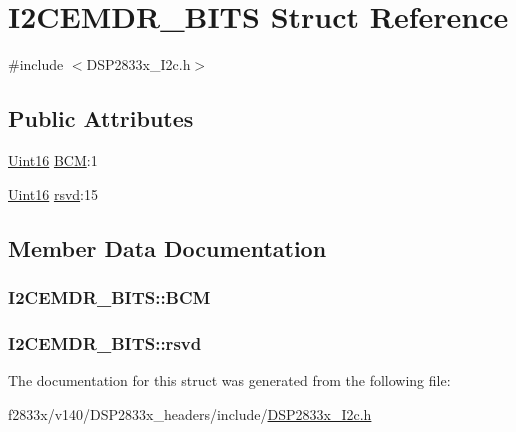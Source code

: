 \hypertarget{struct_i2_c_e_m_d_r___b_i_t_s}{}\section{I2\+C\+E\+M\+D\+R\+\_\+\+B\+I\+T\+S Struct Reference}
\label{struct_i2_c_e_m_d_r___b_i_t_s}


{\ttfamily \#include $<$D\+S\+P2833x\+\_\+\+I2c.\+h$>$}

\subsection*{Public Attributes}
\begin{DoxyCompactItemize}
\item 
\hyperlink{_d_s_p2833x___device_8h_a59a9f6be4562c327cbfb4f7e8e18f08b}{Uint16} \hyperlink{struct_i2_c_e_m_d_r___b_i_t_s_aebd250c5011e2a707e99aa3416451302}{B\+C\+M}\+:1
\item 
\hyperlink{_d_s_p2833x___device_8h_a59a9f6be4562c327cbfb4f7e8e18f08b}{Uint16} \hyperlink{struct_i2_c_e_m_d_r___b_i_t_s_a3a69d680d55fb31f9a43bed1d5a1e2c9}{rsvd}\+:15
\end{DoxyCompactItemize}


\subsection{Member Data Documentation}
\hypertarget{struct_i2_c_e_m_d_r___b_i_t_s_aebd250c5011e2a707e99aa3416451302}{}
\subsubsection[{B\+C\+M}]{ I2\+C\+E\+M\+D\+R\+\_\+\+B\+I\+T\+S\+::\+B\+C\+M}\label{struct_i2_c_e_m_d_r___b_i_t_s_aebd250c5011e2a707e99aa3416451302}
\hypertarget{struct_i2_c_e_m_d_r___b_i_t_s_a3a69d680d55fb31f9a43bed1d5a1e2c9}{}
\subsubsection[{rsvd}]{ I2\+C\+E\+M\+D\+R\+\_\+\+B\+I\+T\+S\+::rsvd}\label{struct_i2_c_e_m_d_r___b_i_t_s_a3a69d680d55fb31f9a43bed1d5a1e2c9}


The documentation for this struct was generated from the following file\+:\begin{DoxyCompactItemize}
\item 
f2833x/v140/\+D\+S\+P2833x\+\_\+headers/include/\hyperlink{_d_s_p2833x___i2c_8h}{D\+S\+P2833x\+\_\+\+I2c.\+h}\end{DoxyCompactItemize}
